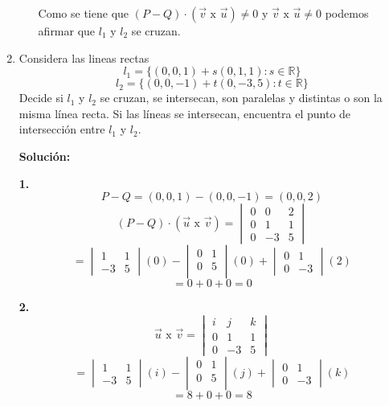 \documentclass{article}
\begin{document}
\begin{enumerate}
\begin{itemize}
        Como se tiene que $(P-Q) \cdot (\vec{v} \text{ x } \vec{u})\neq 0$ y $\vec{v}\text{ x } \vec{u}\neq 0$ podemos afirmar 
        que $l_1$ y $l_2$ se cruzan.
    \end{itemize}

    \item Considera las lineas rectas $$l_1 = \{(0,0,1)+ s(0,1,1): s \in \mathbb{R}\}$$ 
    $$l_2 = \{(0,0,-1)+ t(0,-3,5): t \in \mathbb{R}\}$$ 
    Decide si $l_1$ y $l_2$ se cruzan, se intersecan, son paralelas y distintas o son la misma línea recta. 
    Si las líneas se intersecan, encuentra el punto de intersección entre $l_1$ y $l_2$.
    \vspace{10pt}

    \textbf{Solución:}
    \vspace{10pt} 
    
    \begin{minipage}[c]{0.5cm}
        \textbf{1.}
        $$P- Q =(0,0,1)-(0,0,-1) =(0,0,2)$$
        $$(P-Q) \cdot (\vec{u}\text{ x } \vec{v})= \begin{vmatrix}
            0 & 0 & 2 \\
            0 & 1 & 1 \\
            0 & -3 & 5
        \end{vmatrix}$$
        $$ = \begin{vmatrix}
            1 & 1 \\
            -3 & 5
        \end{vmatrix}(0) - \begin{vmatrix}
            0 & 1 \\
            0 & 5 \\
        \end{vmatrix}(0) + \begin{vmatrix}
            0 & 1 \\
            0 & -3 
        \end{vmatrix}(2)$$
        $$ = 0+0+0 = 0$$
    \end{minipage}\hspace*{7cm}\begin{minipage}[c]{0.5cm}
        \textbf{2.}
        $$\vec{u}\text{ x }\vec{v} = \begin{vmatrix}
            i & j & k \\
            0 & 1 & 1 \\
            0 & -3 & 5
        \end{vmatrix}$$
        $$ = \begin{vmatrix}
            1 & 1 \\
            -3 & 5
        \end{vmatrix}(i) - \begin{vmatrix}
            0 & 1 \\
            0 & 5 \\
        \end{vmatrix}(j) + \begin{vmatrix}
            0 & 1 \\
            0 & -3 
        \end{vmatrix}(k)$$
        $$ = 8+0+0 = 8$$
    \end{minipage}


\end{enumerate}
\end{document}
